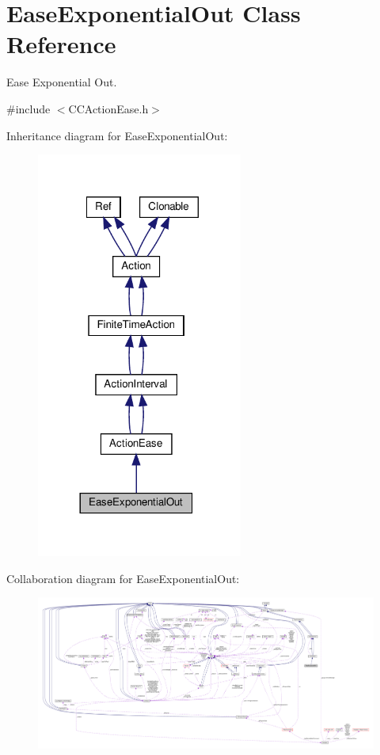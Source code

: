 \hypertarget{classEaseExponentialOut}{}\section{Ease\+Exponential\+Out Class Reference}
\label{classEaseExponentialOut}


Ease Exponential Out.  




{\ttfamily \#include $<$C\+C\+Action\+Ease.\+h$>$}



Inheritance diagram for Ease\+Exponential\+Out\+:
\nopagebreak
\begin{figure}[H]
\begin{center}
\leavevmode
\includegraphics[width=192pt]{classEaseExponentialOut__inherit__graph}
\end{center}
\end{figure}


Collaboration diagram for Ease\+Exponential\+Out\+:
\nopagebreak
\begin{figure}[H]
\begin{center}
\leavevmode
\includegraphics[width=350pt]{classEaseExponentialOut__coll__graph}
\end{center}
\end{figure}
